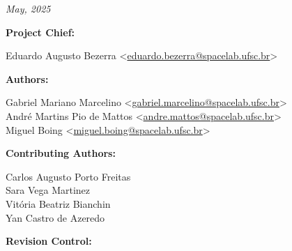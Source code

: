 %
%
%
%
%

%
%
%
%
%

\thispagestyle{empty}

\begin{center}

\textbf{\thetitle}

\textit{May, 2025}

\vspace{1cm}

\textbf{Project Chief:}

Eduardo Augusto Bezerra <\href{mailto:eduardo.bezerra@spacelab.ufsc.br}{eduardo.bezerra@spacelab.ufsc.br}>

\vspace{1cm}

\textbf{Authors:}

Gabriel Mariano Marcelino <\href{mailto:gabriel.marcelino@spacelab.ufsc.br}{gabriel.marcelino@spacelab.ufsc.br}> \\
André Martins Pio de Mattos <\href{mailto:andre.mattos@spacelab.ufsc.br}{andre.mattos@spacelab.ufsc.br}> \\
Miguel Boing <\href{mailto:miguel.boing@spacelab.ufsc.br}{miguel.boing@spacelab.ufsc.br}> \\

\vspace{1cm}

\textbf{Contributing Authors:}

Carlos Augusto Porto Freitas \\
Sara Vega Martinez \\
Vitória Beatriz Bianchin \\
Yan Castro de Azeredo \\

\vspace{1cm}

\textbf{Revision Control:}

\end{center}

